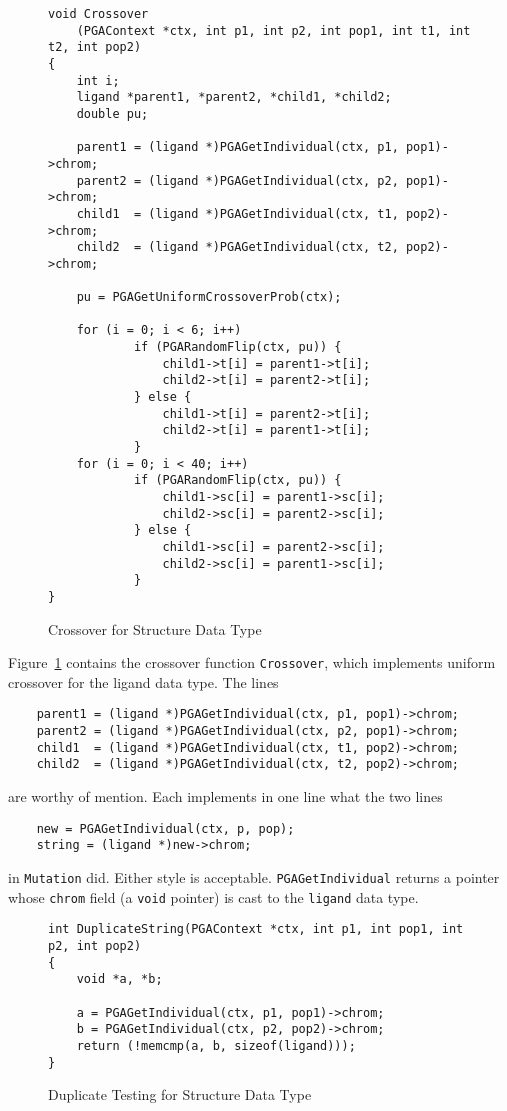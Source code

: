 \documentclass{report}
\begin{document}
\begin{figure}
\begin{verbatim}
void Crossover
    (PGAContext *ctx, int p1, int p2, int pop1, int t1, int t2, int pop2)
{
    int i;
    ligand *parent1, *parent2, *child1, *child2;
    double pu;

    parent1 = (ligand *)PGAGetIndividual(ctx, p1, pop1)->chrom;
    parent2 = (ligand *)PGAGetIndividual(ctx, p2, pop1)->chrom;
    child1  = (ligand *)PGAGetIndividual(ctx, t1, pop2)->chrom;
    child2  = (ligand *)PGAGetIndividual(ctx, t2, pop2)->chrom;

    pu = PGAGetUniformCrossoverProb(ctx);

    for (i = 0; i < 6; i++)
            if (PGARandomFlip(ctx, pu)) {
                child1->t[i] = parent1->t[i];
                child2->t[i] = parent2->t[i];
            } else {
                child1->t[i] = parent2->t[i];
                child2->t[i] = parent1->t[i];
            }
    for (i = 0; i < 40; i++)
            if (PGARandomFlip(ctx, pu)) {
                child1->sc[i] = parent1->sc[i];
                child2->sc[i] = parent2->sc[i];
            } else {
                child1->sc[i] = parent2->sc[i];
                child2->sc[i] = parent1->sc[i];
            }
}
\end{verbatim}
\caption{Crossover for Structure Data Type}
\label{example1:new-datatype-crossover}
\end{figure}

Figure~\ref{example1:new-datatype-crossover} contains the crossover function
{\tt Crossover}, which implements uniform crossover for the ligand data type.
The lines
\begin{verbatim}
    parent1 = (ligand *)PGAGetIndividual(ctx, p1, pop1)->chrom;
    parent2 = (ligand *)PGAGetIndividual(ctx, p2, pop1)->chrom;
    child1  = (ligand *)PGAGetIndividual(ctx, t1, pop2)->chrom;
    child2  = (ligand *)PGAGetIndividual(ctx, t2, pop2)->chrom;
\end{verbatim}
are worthy of  mention.  Each implements in one line what the two lines 
\begin{verbatim}
    new = PGAGetIndividual(ctx, p, pop);
    string = (ligand *)new->chrom;
\end{verbatim}
in {\tt Mutation} did.  Either style is acceptable.  {\tt PGAGetIndividual}
returns a pointer whose {\tt chrom} field (a {\tt void} pointer) is cast to
the {\tt ligand} data type.

\begin{figure}
\begin{verbatim}
int DuplicateString(PGAContext *ctx, int p1, int pop1, int p2, int pop2)
{
    void *a, *b;

    a = PGAGetIndividual(ctx, p1, pop1)->chrom;
    b = PGAGetIndividual(ctx, p2, pop2)->chrom;
    return (!memcmp(a, b, sizeof(ligand)));
}
\end{verbatim}
\caption{Duplicate Testing for Structure Data Type}
\label{example1:new-datatype-duplicate}
\end{figure}
\end{document}
